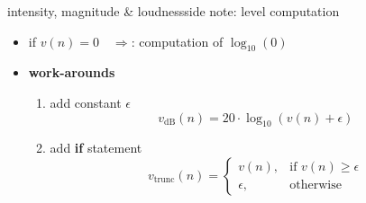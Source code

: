         \begin{frame}{intensity, magnitude \& loudness}{side note: level computation}
            \begin{itemize}
                \item if $v(n) = 0\quad\Rightarrow$: computation of $\log_{10}(0)$
                \item<2-> \textbf{work-arounds}
                    \begin{enumerate}[a]
                        \item	add constant $\epsilon$
                            \begin{equation*}
                                v_\mathrm{dB}(n) = 20\cdot\log_{10}(v(n) + \epsilon)
                            \end{equation*}

                        \item<3->	add \textbf{if} statement	
                            \begin{equation*}
                                v_\mathrm{trunc}(n)  =   \left\{ 
                                            \begin{array}{ll} 
                                                v(n), & \text{if } v(n) \geq \epsilon \\
                                                \epsilon, & \text{otherwise }
                                            \end{array} 
                                            \right. 
                            \end{equation*}
                    \end{enumerate}
            \end{itemize}
        \end{frame}
        
